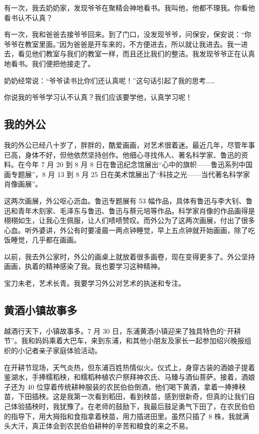 \documentclass[UTF8,a4paper,titlepage,twoside,10.5pt]{article}
\begin{document}
有一次，我去奶奶家，发现爷爷在聚精会神地看书。我叫他，他都不理我。你看他看书认不认真？

有一次，我和爸爸去接爷爷回来。到了门口，没发现爷爷，问保安，保安说：“你爷爷在教室里面。”因为爸爸是开车来的，不方便进去，所以就让我进去。我一进去，看见他们教室与我们的教室一样，而且还比我们的整洁。我发现爷爷正在认真地看书。我们便把他接走了。

奶奶经常说：“爷爷读书比你们还认真呢！”这句话引起了我的思考……

你说我的爷爷学习认不认真？我们应该要学他，认真学习呢！

\subsection{我的外公}
\label{sec:orga8e34f8}

我的外公已经八十岁了，胖胖的，酷爱画画，对艺术很着迷。最近几年，尽管年事已高，身体不好，但他依然坚持创作。他细心寻找伟人、著名科学家、鲁迅的资料。在今年 7 月 20 到 8 月 8 日在鲁迅纪念馆展出“心中的旗帜——鲁迅系列中国画专题展”，8 月 13 到 8 月 25 日在美术馆展出了“科技之光——当代著名科学家肖像画展”。

这两次画展，外公呕心沥血。鲁迅专题展有 53 幅作品，具体有鲁迅与李大钊、鲁迅和青年木刻家、毛泽东与鲁迅、鲁迅与蔡元培等作品。科学家肖像的作品画得是栩栩如生，让我心生佩服，让人们啧啧赞叹。而外公为了这两次画展，付出了很多心血。听外婆讲，外公有时要凌晨一两点钟睡觉，早上五点钟就开始画画，除了吃饭睡觉，几乎都在画画。

以前，我去外公家时，外公的画桌上就放着很多画卷，现在变得更多了。外公坚持画画，执着的精神感染了我。我也要学习这种精神。

宝刀未老，艺术长青。我要学习外公对艺术的执迷和专注。

\subsection{黄酒小镇故事多}
\label{sec:org5821e54}

越酒行天下，小镇故事多。7 月 30 日，东浦黄酒小镇迎来了独具特色的“开耕节”。我和妈妈乘着大巴车，来到东浦，和其他小朋友及家长一起参加绍兴晚报组织的小记者亲子家庭体验活动。

在开耕节现场，天气炎热，但东浦百姓热情似火。仪式上，身穿古装的酒娘子提着鉴湖水，手捧糯稻秧，和糯稻种植农户祭拜神农氏、马臻与酒仙菩萨。接着，酒娘子还为 40 位穿着传统耕种服装的农民伯伯倒酒，他们喝下黄酒，拿着一捧捧秧苗，下田插秧。这是我第一次看到稻田，看到秧苗，感到很新奇，但真的让我们自己体验插秧时，我犹豫了。在老师的鼓励下，我最后鼓足勇气下田了，在农民伯伯的指导下，用大拇指和食指拿着秧苗，用力插进田里。虽然只插了 8 株，我就满头大汗，真正体会到农民伯伯耕种的辛苦和粮食的来之不易。
\end{document}

